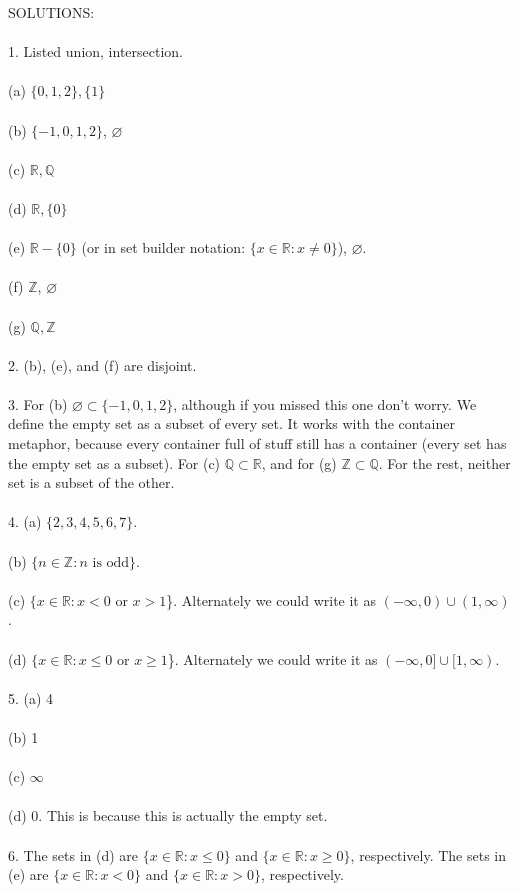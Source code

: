 \documentclass{article}
\newcommand{\R}{\mathbb{R}}
\newcommand{\Z}{\mathbb{Z}}
\newcommand{\Q}{\mathbb{Q}}
\begin{document}
\noindent SOLUTIONS: \\ \\
1. Listed union, intersection. \\ \\
(a) $\{0,1,2\}, \{1\}$
\\ \\
(b) $\{-1,0,1,2\}$, $\varnothing$
\\ \\
(c) $\R, \Q$
\\ \\
(d) $\R, \{0\}$\\ \\
(e) $\R - \{0\}$ (or in set builder notation: $\{x\in \R: x \neq 0\}$), $\varnothing$.
\\ \\
(f) $\Z$, $\varnothing$
\\ \\
(g) $\Q, \Z$ \\ \\
2. (b), (e), and (f) are disjoint. \\ \\
3. For (b) $\varnothing \subset \{-1,0,1,2\}$, although if you missed this one don't worry. We define the empty set as a subset of every set. It works with the container metaphor, because every container full of stuff still has a container (every set has the empty set as a subset). For (c) $\Q \subset \R$, and for (g) $\Z \subset \Q$. For the rest, neither set is a subset of the other. \\ \\
4. 
(a) $\{2,3,4,5,6,7\}$. \\ \\
(b) $\{n \in \Z: n \text{ is odd}\}$.
\\ \\
(c) $\{x\in \R: x < 0 \text{ or } x > 1$\}. Alternately we could write it as $(-\infty, 0) \cup (1, \infty)$.\\ \\
(d) $\{x\in \R: x \leq 0 \text{ or } x \geq 1$\}. Alternately we could write it as $(-\infty, 0] \cup [1, \infty)$.\\ \\
5. 
(a) 4 \\ \\
(b) 1 \\ \\
(c) $\infty$ \\ \\
(d) 0. This is because this is actually the empty set. \\ \\
6. The sets in (d) are $\{x\in \R: x \leq 0\}$ and $\{x\in \R: x \geq 0\}$, respectively. The sets in (e) are $\{ x \in \R: x < 0\}$ and $\{ x \in \R: x > 0\}$, respectively. 
\end{document}
